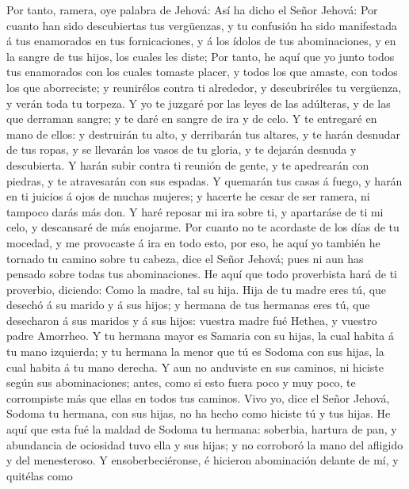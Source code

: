  Por tanto, ramera, oye palabra de Jehová:
 Así ha dicho el Señor Jehová: Por cuanto han sido
descubiertas tus vergüenzas, y tu confusión ha sido manifestada á tus
enamorados en tus fornicaciones, y á los ídolos de tus abominaciones, y
en la sangre de tus hijos, los cuales les diste;  Por
tanto, he aquí que yo junto todos tus enamorados con los cuales tomaste
placer, y todos los que amaste, con todos los que aborreciste; y
reunirélos contra ti alrededor, y descubriréles tu vergüenza, y verán
toda tu torpeza.  Y yo te juzgaré por las leyes de las
adúlteras, y de las que derraman sangre; y te daré en sangre de ira y de
celo.  Y te entregaré en mano de ellos: y destruirán tu
alto, y derribarán tus altares, y te harán desnudar de tus ropas, y se
llevarán los vasos de tu gloria, y te dejarán desnuda y descubierta.
 Y harán subir contra ti reunión de gente, y te
apedrearán con piedras, y te atravesarán con sus espadas.
 Y quemarán tus casas á fuego, y harán en ti juicios á
ojos de muchas mujeres; y hacerte he cesar de ser ramera, ni tampoco
darás más don.  Y haré reposar mi ira sobre ti, y
apartaráse de ti mi celo, y descansaré de más enojarme. 
Por cuanto no te acordaste de los días de tu mocedad, y me provocaste á
ira en todo esto, por eso, he aquí yo también he tornado tu camino sobre
tu cabeza, dice el Señor Jehová; pues ni aun has pensado sobre todas tus
abominaciones.  He aquí que todo proverbista hará de ti
proverbio, diciendo: Como la madre, tal su hija.  Hija de
tu madre eres tú, que desechó á su marido y á sus hijos; y hermana de
tus hermanas eres tú, que desecharon á sus maridos y á sus hijos:
vuestra madre fué Hethea, y vuestro padre Amorrheo.  Y tu
hermana mayor es Samaria con su hijas, la cual habita á tu mano
izquierda; y tu hermana la menor que tú es Sodoma con sus hijas, la cual
habita á tu mano derecha.  Y aun no anduviste en sus
caminos, ni hiciste según sus abominaciones; antes, como si esto fuera
poco y muy poco, te corrompiste más que ellas en todos tus caminos.
 Vivo yo, dice el Señor Jehová, Sodoma tu hermana, con
sus hijas, no ha hecho como hiciste tú y tus hijas.  He
aquí que esta fué la maldad de Sodoma tu hermana: soberbia, hartura de
pan, y abundancia de ociosidad tuvo ella y sus hijas; y no corroboró la
mano del afligido y del menesteroso.  Y
ensoberbeciéronse, é hicieron abominación delante de mí, y quitélas como
